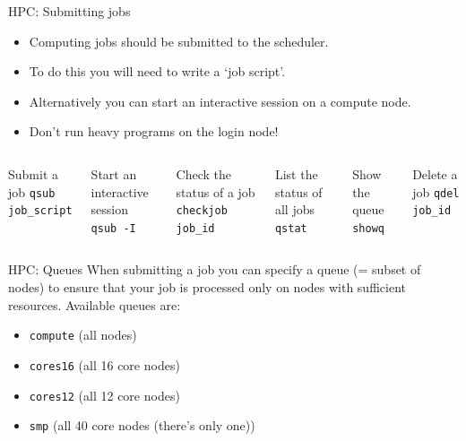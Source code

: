\documentclass{beamer}
\begin{document}
\begin{frame}{HPC: Submitting jobs}
	\begin{itemize}
		\item Computing jobs should be submitted to the scheduler.
		\item To do this you will need to write a `job script'.
		\item Alternatively you can start an interactive session on a compute node.
		\item Don't run heavy programs on the login node!
	\end{itemize}
    \begin{Examples}
	    \begin{columns}
		\begin{block}{Submit a job}
			\texttt{qsub job\_script}
		\end{block}
		\begin{block}{Start an interactive session}
			\texttt{qsub -I}
		\end{block}
		\begin{block}{Check the status of a job}
			\texttt{checkjob job\_id}
		\end{block}

		\begin{block}{List the status of all jobs}
			\texttt{qstat}
		\end{block}
		\begin{block}{Show the queue}
			\texttt{showq}
		\end{block}		
		\begin{block}{Delete a job}
			\texttt{qdel job\_id}
		\end{block}
	    \end{columns}		
    \end{Examples}
\end{frame}

\begin{frame}{HPC: Queues}
  When submitting a job you can specify a queue (= subset of nodes) to ensure that your job is processed only on nodes with sufficient resources. Available queues are:
	\begin{itemize}
		\item \texttt{compute} (all nodes)
		\item \texttt{cores16} (all 16 core nodes)
		\item \texttt{cores12} (all 12 core nodes)
		\item \texttt{smp} (all 40 core nodes (there's only one))
	\end{itemize}
\end{frame}
\end{document}
